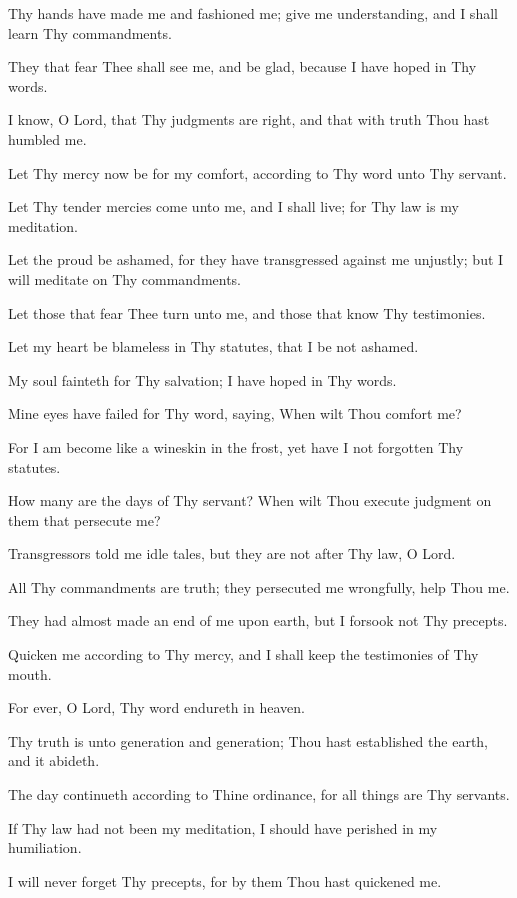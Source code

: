 Thy hands have made me and fashioned me; give me understanding, and I shall learn Thy commandments.

They that fear Thee shall see me, and be glad, because I have hoped in Thy words.

I know, O Lord, that Thy judgments are right, and that with truth Thou hast humbled me.

Let Thy mercy now be for my comfort, according to Thy word unto Thy servant.

Let Thy tender mercies come unto me, and I shall live; for Thy law is my meditation.

Let the proud be ashamed, for they have transgressed against me unjustly; but I will meditate on Thy commandments.

Let those that fear Thee turn unto me, and those that know Thy testimonies.

Let my heart be blameless in Thy statutes, that I be not ashamed.

My soul fainteth for Thy salvation; I have hoped in Thy words.

Mine eyes have failed for Thy word, saying, When wilt Thou comfort me?

For I am become like a wineskin in the frost, yet have I not forgotten Thy statutes.

How many are the days of Thy servant? When wilt Thou execute judgment on them that persecute me?

Transgressors told me idle tales, but they are not after Thy law, O Lord.

All Thy commandments are truth; they persecuted me wrongfully, help Thou me.

They had almost made an end of me upon earth, but I forsook not Thy precepts.

Quicken me according to Thy mercy, and I shall keep the testimonies of Thy mouth.

For ever, O Lord, Thy word endureth in heaven.

Thy truth is unto generation and generation; Thou hast established the earth, and it abideth.

The day continueth according to Thine ordinance, for all things are Thy servants.

If Thy law had not been my meditation, I should have perished in my humiliation.

I will never forget Thy precepts, for by them Thou hast quickened me.
